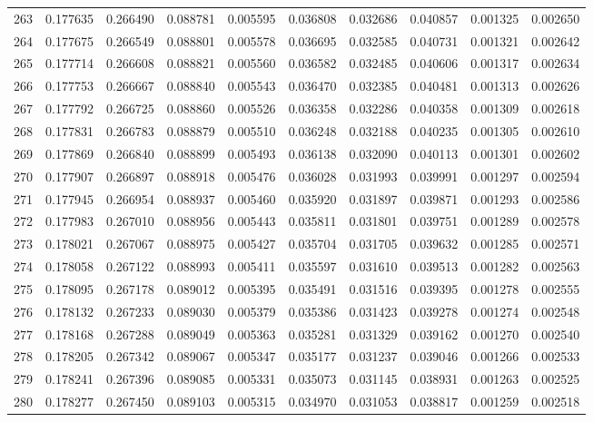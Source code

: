 \begin{tabular}{lrrrrrrrrr}
263 & 0.177635 & 0.266490 & 0.088781 & 0.005595 & 0.036808 & 0.032686 & 0.040857 & 0.001325 & 0.002650 \\
264 & 0.177675 & 0.266549 & 0.088801 & 0.005578 & 0.036695 & 0.032585 & 0.040731 & 0.001321 & 0.002642 \\
265 & 0.177714 & 0.266608 & 0.088821 & 0.005560 & 0.036582 & 0.032485 & 0.040606 & 0.001317 & 0.002634 \\
266 & 0.177753 & 0.266667 & 0.088840 & 0.005543 & 0.036470 & 0.032385 & 0.040481 & 0.001313 & 0.002626 \\
267 & 0.177792 & 0.266725 & 0.088860 & 0.005526 & 0.036358 & 0.032286 & 0.040358 & 0.001309 & 0.002618 \\
268 & 0.177831 & 0.266783 & 0.088879 & 0.005510 & 0.036248 & 0.032188 & 0.040235 & 0.001305 & 0.002610 \\
269 & 0.177869 & 0.266840 & 0.088899 & 0.005493 & 0.036138 & 0.032090 & 0.040113 & 0.001301 & 0.002602 \\
270 & 0.177907 & 0.266897 & 0.088918 & 0.005476 & 0.036028 & 0.031993 & 0.039991 & 0.001297 & 0.002594 \\
271 & 0.177945 & 0.266954 & 0.088937 & 0.005460 & 0.035920 & 0.031897 & 0.039871 & 0.001293 & 0.002586 \\
272 & 0.177983 & 0.267010 & 0.088956 & 0.005443 & 0.035811 & 0.031801 & 0.039751 & 0.001289 & 0.002578 \\
273 & 0.178021 & 0.267067 & 0.088975 & 0.005427 & 0.035704 & 0.031705 & 0.039632 & 0.001285 & 0.002571 \\
274 & 0.178058 & 0.267122 & 0.088993 & 0.005411 & 0.035597 & 0.031610 & 0.039513 & 0.001282 & 0.002563 \\
275 & 0.178095 & 0.267178 & 0.089012 & 0.005395 & 0.035491 & 0.031516 & 0.039395 & 0.001278 & 0.002555 \\
276 & 0.178132 & 0.267233 & 0.089030 & 0.005379 & 0.035386 & 0.031423 & 0.039278 & 0.001274 & 0.002548 \\
277 & 0.178168 & 0.267288 & 0.089049 & 0.005363 & 0.035281 & 0.031329 & 0.039162 & 0.001270 & 0.002540 \\
278 & 0.178205 & 0.267342 & 0.089067 & 0.005347 & 0.035177 & 0.031237 & 0.039046 & 0.001266 & 0.002533 \\
279 & 0.178241 & 0.267396 & 0.089085 & 0.005331 & 0.035073 & 0.031145 & 0.038931 & 0.001263 & 0.002525 \\
280 & 0.178277 & 0.267450 & 0.089103 & 0.005315 & 0.034970 & 0.031053 & 0.038817 & 0.001259 & 0.002518 \\

\end{tabular}
